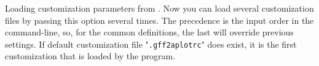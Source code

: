 %
   { Loading customization parameters from . Now you can load several customization files by passing this option several times. The precedence is the input order in the command-line, so, for the common definitions, the last  will override previous  settings. If default customization file "\texttt{.gff2aplotrc}" does exist, it is the first customization that is loaded by the program. }
%
   { {\tbdef} }
%
